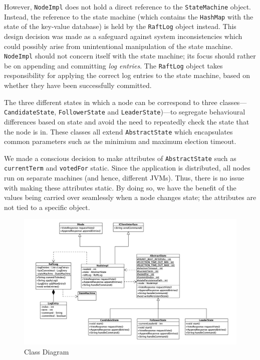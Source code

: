 \documentclass[12pt, a4paper]{article}
\begin{document}
However, \texttt{NodeImpl} does not hold a direct reference to the \texttt{StateMachine} object. Instead, the reference to the state machine (which contains the \texttt{HashMap} with the state of the key-value database) is held by the \texttt{RaftLog} object instead. This design decision was made as a safeguard against system inconsistencies which could possibly arise from unintentional manipulation of the state machine. \texttt{NodeImpl} should not concern itself with the state machine; its focus should rather be on appending and committing \textit{log entries}. The \texttt{RaftLog} object takes responsibility for applying the correct log entries to the state machine, based on whether they have been successfully committed.

The three different states in which a node can be correspond to three classes---\texttt{CandidateState}, \texttt{FollowerState} and \texttt{LeaderState})---to segregate behavioural differences based on state and avoid the need to repeatedly check the state that the node is in. These classes all extend \texttt{AbstractState} which encapsulates common parameters such as the minimium and maximum election timeout.

We made a conscious decision to make attributes of \texttt{AbstractState} such as \texttt{currentTerm} and \texttt{votedFor} static. Since the application is distributed, all nodes run on separate machines (and hence, different JVMs). Thus, there is no issue with making these attributes static. By doing so, we have the benefit of the values being carried over seamlessly when a node changes state; the attributes are not tied to a specific object.

\begin{figure}[htp]
  \centering
  \includegraphics[width=1\textwidth]{img/class-diragram.png}
  \caption{Class Diagram}
  \label{fig:uml}
\end{figure}
\end{document}
